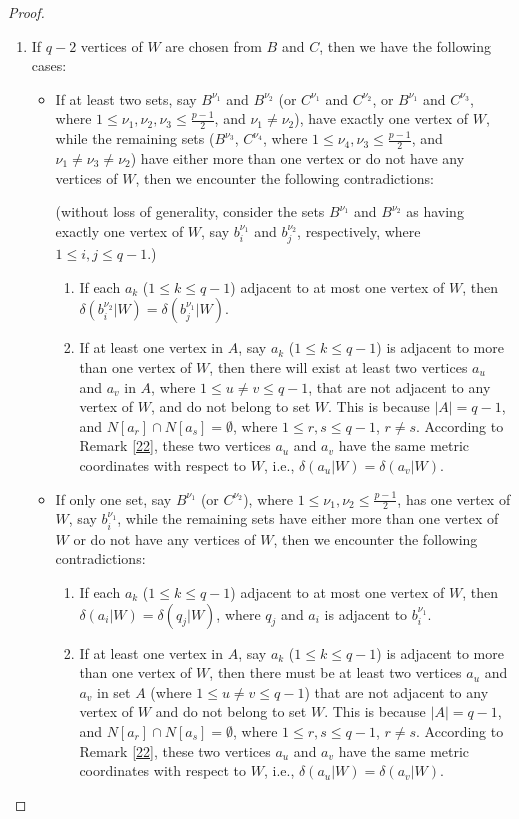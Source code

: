 \documentclass[]{interact}
\theoremstyle{plain}%
\theoremstyle{definition}
\theoremstyle{remark}
\begin{document}
\begin{proof}
\begin{enumerate}
\item If $q-2$ vertices of $W$ are chosen from  $B$ and $C$, then we have the following cases: 
\begin{itemize}
    \item If at least two sets, say \(B^{\nu_1}\) and \(B^{\nu_2}\) (or \(C^{\nu_1}\) and \(C^{\nu_2}\), or \(B^{\nu_1}\) and \(C^{\nu_3}\), where \(1 \leq \nu_1, \nu_2, \nu_3 \leq \frac{p-1}{2}\), and \(\nu_1 \neq \nu_2\)), have exactly one vertex of \(W\), while the remaining sets ($B^{\nu_3}$, $C^{\nu_4}$, where \(1\leq \nu_4, \nu_3 \leq \frac{p-1}{2}\), and $\nu_1 \neq \nu_3 \neq \nu_2$) have either more than one vertex or do not have any vertices of \(W\), then we encounter the following contradictions:
    
(without loss of generality, consider the sets \(B^{\nu_1}\) and \(B^{\nu_2}\) as having exactly one vertex of \(W\), say \(b^{\nu_1}_i\) and \(b^{\nu_2}_j\), respectively, where \(1 \leq i, j \leq q-1\).)
    \begin{enumerate}
        \item If each $a_k$ ($1\leq k \leq q-1$) adjacent to at most one vertex of $W$, then $\delta( b^{\nu_2}_i|W) =\delta( b^{\nu_1}_{j}|W)$.
\item If at least one vertex in $A$, say $a_k$ ($1\leq k \leq q-1$) is adjacent to more than one vertex of $W$, then there will exist at least two vertices $a_u$ and $a_v$ in $A$, where $1 \leq u \neq v \leq q-1$, that are not adjacent to any vertex of $W$, and do not belong to set $W$. This is because $|A|=q-1$, and $N[a_r]\cap N[a_s]=\emptyset$, where $1\leq r,s\leq q-1$, $r\neq s$. According to Remark \ref{22}, these two vertices $a_u$ and $a_v$ have the same metric coordinates with respect to $W$, i.e., $\delta(a_u|W) = \delta(a_v|W)$.
 \end{enumerate}
    \item If only one set, say $B^{\nu_1}$ (or $C^{\nu_2}$), where $1 \leq \nu_1, \nu_2 \leq \frac{p-1}{2}$, has one vertex of $W$, say $b^{\nu_1}_i$, while the remaining sets have either more than one vertex of $W$ or do not have any vertices of $W$, then we encounter the following contradictions:
    \begin{enumerate}
        \item If each $a_k$ ($1\leq k \leq q-1$)  adjacent to at most one vertex of $W$, then $\delta(a_i|W) = \delta(q_j|W)$, where $q_j$ and $a_i$ is adjacent to $b^{\nu_1}_i$.
        \item If at least one vertex in $A$, say $a_k$ ($1\leq k \leq q-1$) is adjacent to more than one vertex of $W$, then there must be at least two vertices $a_u$ and $a_v$ in set $A$ (where $1 \leq u \neq v \leq q-1$) that are not adjacent to any vertex of $W$ and do not belong to set $W$. This is because $|A|=q-1$, and $N[a_r]\cap N[a_s]=\emptyset$, where $1\leq r,s\leq q-1$, $r\neq s$. According to Remark \ref{22}, these two vertices $a_u$ and $a_v$ have the same metric coordinates with respect to $W$, i.e., $\delta(a_u|W) = \delta(a_v|W)$.

\end{enumerate}
\end{itemize}
\end{enumerate}
\end{proof}
\end{document}
